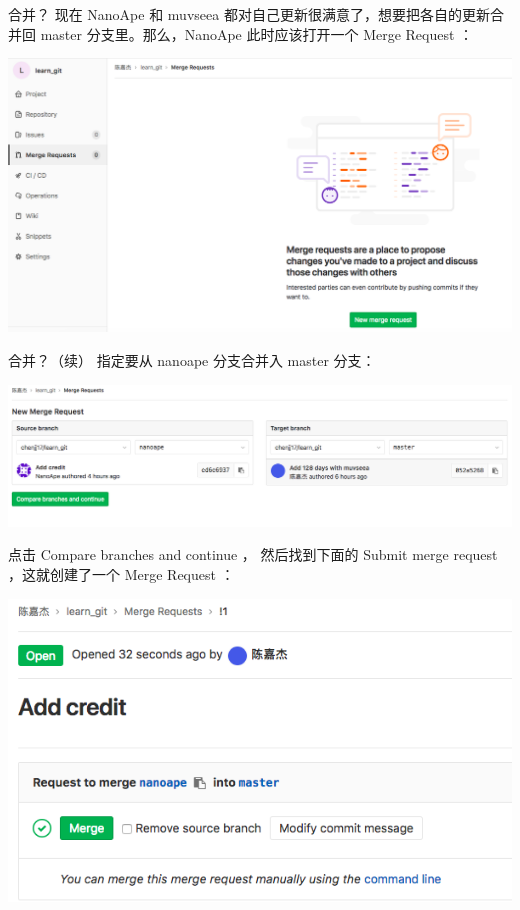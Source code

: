 \documentclass{beamer}
\begin{document}
\begin{frame}{合并？}
    现在 NanoApe 和 muvseea 都对自己更新很满意了，想要把各自的更新合并回 master 分支里。那么，NanoApe 此时应该打开一个 Merge Request ：

    \includegraphics[width=\linewidth]{2018-10-25-16-49-36.png}
\end{frame}

\begin{frame}{合并？（续）}
    指定要从 nanoape 分支合并入 master 分支：

    \includegraphics[width=\linewidth]{2018-10-25-16-50-58.png}

    点击 Compare branches and continue ， 然后找到下面的 Submit merge request ，这就创建了一个 Merge Request ：

    \includegraphics[width=\linewidth]{2018-10-25-16-52-33.png}
\end{frame}
\end{document}
